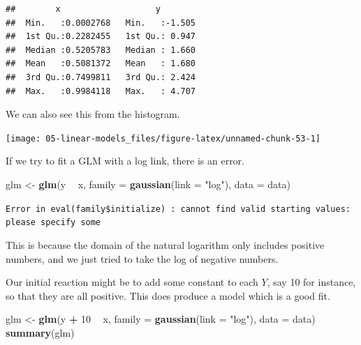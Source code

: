 \documentclass[openany]{book}
\newenvironment{Shaded}{\begin{snugshade}}{\end{snugshade}}
\newcommand{\DataTypeTok}[1]{\textcolor[rgb]{0.13,0.29,0.53}{#1}}
\newcommand{\DecValTok}[1]{\textcolor[rgb]{0.00,0.00,0.81}{#1}}
\newcommand{\FloatTok}[1]{\textcolor[rgb]{0.00,0.00,0.81}{#1}}
\newcommand{\KeywordTok}[1]{\textcolor[rgb]{0.13,0.29,0.53}{\textbf{#1}}}
\newcommand{\NormalTok}[1]{#1}
\newcommand{\OperatorTok}[1]{\textcolor[rgb]{0.81,0.36,0.00}{\textbf{#1}}}
\newcommand{\StringTok}[1]{\textcolor[rgb]{0.31,0.60,0.02}{#1}}
\begin{document}
\begin{verbatim}
##        x                   y         
##  Min.   :0.0002768   Min.   :-1.505  
##  1st Qu.:0.2282455   1st Qu.: 0.947  
##  Median :0.5205783   Median : 1.660  
##  Mean   :0.5081372   Mean   : 1.680  
##  3rd Qu.:0.7499811   3rd Qu.: 2.424  
##  Max.   :0.9984118   Max.   : 4.707
\end{verbatim}

We can also see this from the histogram.

\begin{Shaded}
\end{Shaded}

\begin{center}\texttt{[image: 05-linear-models\_files/figure-latex/unnamed-chunk-53-1]} \end{center}

If we try to fit a GLM with a log link, there is an error.

\begin{Shaded}
\begin{Highlighting}[]
\NormalTok{glm <-}\StringTok{ }\KeywordTok{glm}\NormalTok{(y }\OperatorTok{~}\StringTok{ }\NormalTok{x, }\DataTypeTok{family =} \KeywordTok{gaussian}\NormalTok{(}\DataTypeTok{link =} \StringTok{"log"}\NormalTok{), }\DataTypeTok{data =}\NormalTok{ data)}
\end{Highlighting}
\end{Shaded}

\texttt{Error\ in\ eval(family\$initialize)\ :\ cannot\ find\ valid\ starting\ values:\ please\ specify\ some}

This is because the domain of the natural logarithm only includes positive numbers, and we just tried to take the log of negative numbers.

Our initial reaction might be to add some constant to each \(Y\), say 10 for instance, so that they are all positive. This does produce a model which is a good fit.

\begin{Shaded}
\begin{Highlighting}[]
\NormalTok{glm <-}\StringTok{ }\KeywordTok{glm}\NormalTok{(y }\OperatorTok{+}\StringTok{ }\DecValTok{10} \OperatorTok{~}\StringTok{ }\NormalTok{x, }\DataTypeTok{family =} \KeywordTok{gaussian}\NormalTok{(}\DataTypeTok{link =} \StringTok{"log"}\NormalTok{), }\DataTypeTok{data =}\NormalTok{ data)}
\KeywordTok{summary}\NormalTok{(glm)}
\end{Highlighting}
\end{Shaded}
\end{document}
